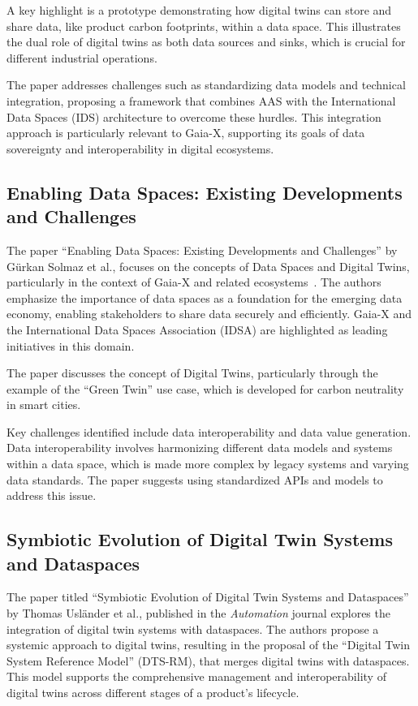 A key highlight is a prototype demonstrating how digital twins can store and share data, like product carbon footprints, within a data space.
This illustrates the dual role of digital twins as both data sources and sinks, which is crucial for different industrial operations.

The paper addresses challenges such as standardizing data models and technical integration, proposing a framework that combines AAS with the International Data Spaces (IDS) architecture to overcome these hurdles.
This integration approach is particularly relevant to Gaia-X, supporting its goals of data sovereignty and interoperability in digital ecosystems.

\subsection{Enabling Data Spaces: Existing Developments and Challenges}\label{subsec:enabling-data-spaces:-existing-developments-and-challenges}

The paper ``Enabling Data Spaces: Existing Developments and Challenges'' by Gürkan Solmaz et al., focuses on the concepts of Data Spaces and Digital Twins, particularly in the context of Gaia-X and related ecosystems~\cite{enabling_data_spaces}.
The authors emphasize the importance of data spaces as a foundation for the emerging data economy, enabling stakeholders to share data securely and efficiently.
Gaia-X and the International Data Spaces Association (IDSA) are highlighted as leading initiatives in this domain.

The paper discusses the concept of Digital Twins, particularly through the example of the ``Green Twin'' use case, which is developed for carbon neutrality in smart cities.

Key challenges identified include data interoperability and data value generation.
Data interoperability involves harmonizing different data models and systems within a data space, which is made more complex by legacy systems and varying data standards.
The paper suggests using standardized APIs and models to address this issue.

\subsection{Symbiotic Evolution of Digital Twin Systems and Dataspaces}\label{subsec:symbiotic-evolution-of-digital-twin-systems-and-dataspaces}

The paper titled ``Symbiotic Evolution of Digital Twin Systems and Dataspaces'' by Thomas Usländer et al., published in the \textit{Automation} journal explores the integration of digital twin systems with dataspaces.
The authors propose a systemic approach to digital twins, resulting in the proposal of the ``Digital Twin System Reference Model'' (DTS-RM), that merges digital twins with dataspaces.
This model supports the comprehensive management and interoperability of digital twins across different stages of a product's lifecycle.


